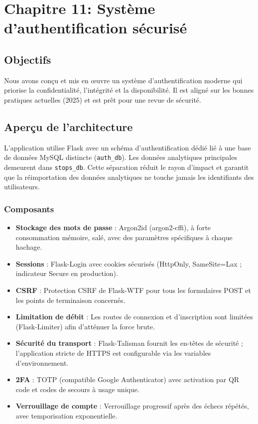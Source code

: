 \chapter{Chapitre 11: Système d'authentification sécurisé}\label{chap:auth}

\section{Objectifs}
Nous avons conçu et mis en œuvre un système d'authentification moderne qui priorise la confidentialité, l'intégrité et la disponibilité. Il est aligné sur les bonnes pratiques actuelles (2025) et est prêt pour une revue de sécurité.

\section{Aperçu de l'architecture}
L'application utilise Flask avec un schéma d'authentification dédié lié à une base de données MySQL distincte (\texttt{auth\_db}). Les données analytiques principales demeurent dans \texttt{stops\_db}. Cette séparation réduit le rayon d'impact et garantit que la réimportation des données analytiques ne touche jamais les identifiants des utilisateurs.

\subsection{Composants}
\begin{itemize}
  \item \textbf{Stockage des mots de passe} : Argon2id (argon2-cffi), à forte consommation mémoire, salé, avec des paramètres spécifiques à chaque hachage.
  \item \textbf{Sessions} : Flask-Login avec cookies sécurisés (HttpOnly, SameSite=Lax ; indicateur Secure en production).
  \item \textbf{CSRF} : Protection CSRF de Flask-WTF pour tous les formulaires POST et les points de terminaison concernés.
  \item \textbf{Limitation de débit} : Les routes de connexion et d'inscription sont limitées (Flask-Limiter) afin d'atténuer la force brute.
  \item \textbf{Sécurité du transport} : Flask-Talisman fournit les en-têtes de sécurité ; l'application stricte de HTTPS est configurable via les variables d'environnement.
  \item \textbf{2FA} : TOTP (compatible Google Authenticator) avec activation par QR code et codes de secours à usage unique.
  \item \textbf{Verrouillage de compte} : Verrouillage progressif après des échecs répétés, avec temporisation exponentielle.
\end{itemize}

